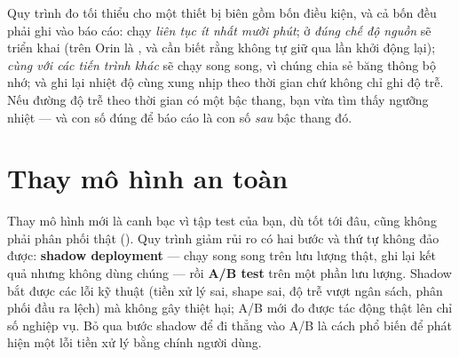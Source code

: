 \documentclass[../../deep_learning.tex]{subfiles}
\begin{document}
Quy trình đo tối thiểu cho một thiết bị biên gồm bốn điều kiện, và cả bốn đều phải ghi vào báo cáo: chạy \emph{liên tục ít nhất mười phút}; ở \emph{đúng chế độ nguồn} sẽ triển khai (trên Orin là , và cần biết rằng  không tự giữ qua lần khởi động lại); \emph{cùng với các tiến trình khác} sẽ chạy song song, vì chúng chia sẻ băng thông bộ nhớ; và ghi lại nhiệt độ cùng xung nhịp theo thời gian chứ không chỉ ghi độ trễ. Nếu đường độ trễ theo thời gian có một bậc thang, bạn vừa tìm thấy ngưỡng nhiệt --- và con số đúng để báo cáo là con số \emph{sau} bậc thang đó.

\section{Thay mô hình an toàn}
Thay mô hình mới là canh bạc vì tập test của bạn, dù tốt tới đâu, cũng không phải phân phối thật (). Quy trình giảm rủi ro có hai bước và thứ tự không đảo được: \textbf{shadow deployment} --- chạy song song trên lưu lượng thật, ghi lại kết quả nhưng không dùng chúng --- rồi \textbf{A/B test} trên một phần lưu lượng. Shadow bắt được các lỗi kỹ thuật (tiền xử lý sai, shape sai, độ trễ vượt ngân sách, phân phối đầu ra lệch) mà không gây thiệt hại; A/B mới đo được tác động thật lên chỉ số nghiệp vụ. Bỏ qua bước shadow để đi thẳng vào A/B là cách phổ biến để phát hiện một lỗi tiền xử lý bằng chính người dùng.

\end{document}
